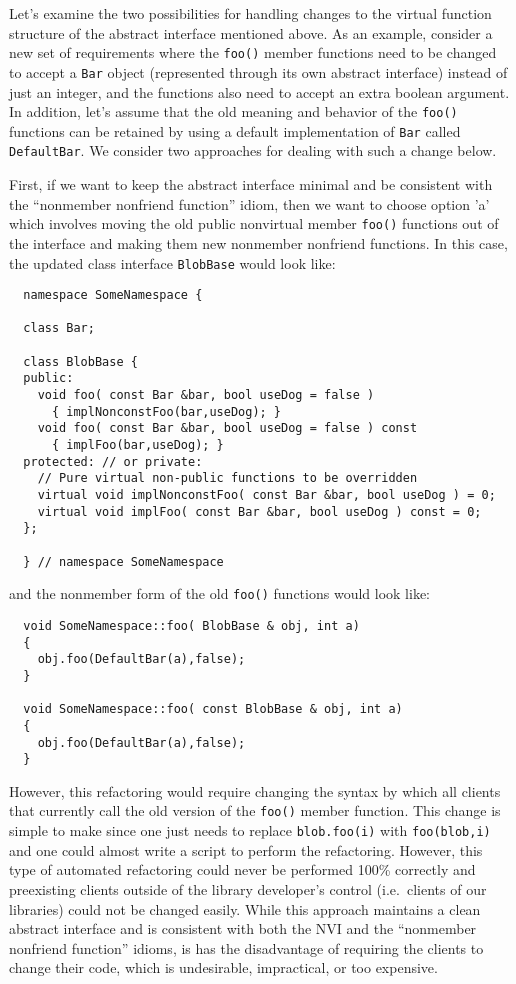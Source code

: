 \documentclass[pdf,ps2pdf,11pt]{SANDreport}
\begin{document}
Let's examine the two possibilities for handling changes to the virtual
function structure of the abstract interface mentioned above.  As an example,
consider a new set of requirements where the {}\texttt{foo()} member functions
need to be changed to accept a {}\texttt{Bar} object (represented through its
own abstract interface) instead of just an integer, and the functions also
need to accept an extra boolean argument.  In addition, let's assume that the
old meaning and behavior of the {}\texttt{foo()} functions can be retained by
using a default implementation of {}\texttt{Bar} called {}\texttt{DefaultBar}.
We consider two approaches for dealing with such a change below.

First, if we want to keep the abstract interface minimal and be consistent
with the ``nonmember nonfriend function'' idiom, then we want to choose option
'a' which involves moving the old public nonvirtual member {}\texttt{foo()}
functions out of the interface and making them new nonmember nonfriend
functions.  In this case, the updated class interface {}\texttt{BlobBase}
would look like:

{\small\begin{verbatim}
  namespace SomeNamespace {

  class Bar;

  class BlobBase {
  public:
    void foo( const Bar &bar, bool useDog = false )
      { implNonconstFoo(bar,useDog); }
    void foo( const Bar &bar, bool useDog = false ) const
      { implFoo(bar,useDog); }
  protected: // or private:
    // Pure virtual non-public functions to be overridden
    virtual void implNonconstFoo( const Bar &bar, bool useDog ) = 0;
    virtual void implFoo( const Bar &bar, bool useDog ) const = 0;
  };

  } // namespace SomeNamespace
\end{verbatim}}

{}\noindent{}and the nonmember form of the old {}\texttt{foo()} functions
would look like:

{\small\begin{verbatim}
  void SomeNamespace::foo( BlobBase & obj, int a)
  {
    obj.foo(DefaultBar(a),false);
  }

  void SomeNamespace::foo( const BlobBase & obj, int a)
  {
    obj.foo(DefaultBar(a),false);
  }
\end{verbatim}}

However, this refactoring would require changing the syntax by which all
clients that currently call the old version of the {}\texttt{foo()} member
function.  This change is simple to make since one just needs to replace
{}\texttt{blob.foo(i)} with {}\texttt{foo(blob,i)} and one could almost write
a script to perform the refactoring.  However, this type of automated
refactoring could never be performed 100\% correctly and preexisting clients
outside of the library developer's control (i.e.\ clients of our libraries)
could not be changed easily.  While this approach maintains a clean abstract
interface and is consistent with both the NVI and the ``nonmember nonfriend
function'' idioms, is has the disadvantage of requiring the clients to change
their code, which is undesirable, impractical, or too expensive.
\end{document}

